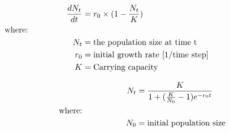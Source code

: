 \documentclass[12pt]{article}
\begin{document}
\begin{align}
\dfrac{dN_{t}}{dt} & = r_{0} \times (1-\frac{N_{t}}{K}) \nonumber \\
&    \hspace{-1.3in}  \text{where:} \nonumber \\
N_{t} & = \text{the population size at time t} \nonumber \\
r_{0} & = \text{initial growth rate [1/time step]} \nonumber \\
K & = \text{Carrying capacity} \nonumber 
\end{align} 

\begin{align}
\hspace{1.3in} N_{t} &= \dfrac{K}{1+(\frac{K}{N_{0}}-1)e^{-r_{0}t}} \nonumber \\
&    \hspace{-1.3in}  \text{where:} \nonumber \\
N_{0} & = \text{initial population size} \nonumber 
\end{align} 
\end{document}

